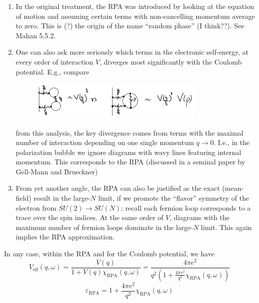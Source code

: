 \begin{enumerate}
    \item In the original treatment, the RPA was introduced by looking at the equation of motion and assuming certain terms with non-cancelling momentum average to zero. This is (?) the origin of the name ``random phase'' (I think??). See Mahan 5.5.2.
    \item One can also ask more seriously which terms in the electronic self-energy, at every order of interaction $V$, diverges most significantly with the Coulomb potential. E.g., compare
    \begin{figure}[H]
        \centering
        \includegraphics[width=0.8\textwidth]{jupyterbook/data/fig/lec19-fig09.png}
    \end{figure}
    from this analysis, the key divergence comes from terms with the maximal number of interaction depending on one single momentum $q\to 0$. I.e., in the polarization bubble we ignore diagrams with wavy lines featuring internal momentum. This corresponds to the RPA (discussed in a seminal paper by Gell-Mann and Brueckner)
    \item From yet another angle, the RPA can also be justified as the exact (mean-field) result in the large-$N$ limit, if we promote the ``flavor'' symmetry of the electron from $SU(2)\to SU(N)$: recall each fermion loop corresponds to a trace over the spin indices. At the same order of $V$, diagrams with the maximum number of fermion loops dominate in the large-$N$ limit. This again implies the RPA approximation.
\end{enumerate}

In any case, within the RPA and for the Coulomb potential, we have
\[ V_{\mathrm{eff}}\left( q,\omega \right) =\frac{V\left( q \right)}{1+V\left( q \right) \chi _{\mathrm{RPA}}\left( q,\omega \right)}=\frac{4\pi e^2}{q^2\left( 1+\frac{4\pi e^2}{q^2}\chi _{\mathrm{RPA}}\left( q,\omega \right) \right)}\]
\[ \varepsilon _{\mathrm{RPA}}=1+\frac{4\pi e^2}{q^2}\chi _{\mathrm{RPA}}\left( q,\omega \right) \]

